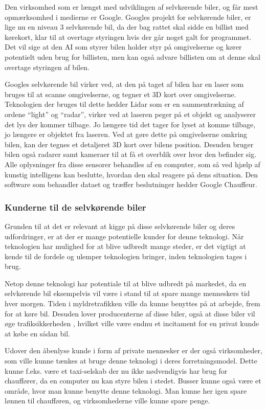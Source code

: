 Den virksomhed som er længst med udviklingen af selvkørende biler, og får mest opmærksomhed i medierne er Google. Googles projekt for selvkørende biler, er lige nu en niveau 3 selvkørende bil, da der bag rattet skal sidde en billist med kørekort, klar til at overtage styringen hvis der går noget galt for programmet. Det vil sige at den AI som styrer bilen holder styr på omgivelserne og kører potentielt uden brug for billisten, men kan også advare billisten om at denne skal overtage styringen af bilen.

Googles selvkørende bil virker ved, at den på taget af bilen har en laser som bruges til at scanne omgivelserne, og tegner et 3D kort over omgivelserne. Teknologien der bruges til dette hedder Lidar som er en sammentrækning af ordene ``light'' og ``radar'', virker ved at laseren peger på et objekt og analyserer det lys der kommer tilbage. Jo længere tid det tager for lyset at komme tilbage, jo længere er objektet fra laseren. Ved at gøre dette på omgivelserne omkring bilen, kan der tegnes et detaljeret 3D kort over bilens position. Desuden bruger bilen også radarer samt kameraer til at få et overblik over hvor den befinder sig. Alle oplysninger fra disse sensorer behandles af en computer, som så ved hjælp af kunstig intelligens kan beslutte, hvordan den skal reagere på dens situation. Den software som behandler dataet og træffer beslutninger hedder Google Chauffeur.

\subsubsection{Kunderne til de selvkørende biler}
Grunden til at det er relevant at kigge på disse selvkørende biler og deres udfordringer, er at der er mange potentielle kunder for denne teknologi. Når teknologien har mulighed for at blive udbredt mange steder, er det vigtigt at kende til de fordele og ulemper teknologien bringer, inden teknologien tages i brug.

Netop denne teknologi har potentiale til at blive udbredt på markedet, da en selvkørende bil eksempelvis vil være i stand til at spare mange menneskers tid hver morgen. Tiden i myldretrafikken ville da kunne benyttes på at arbejde, frem for at køre bil. Desuden lover producenterne af disse biler, også at disse biler vil øge trafiksikkerheden \cite{GOOG_SITE}, hvilket ville være endnu et incitament for en privat kunde at købe en sådan bil.

Udover den åbenlyse kunde i form af private mennesker er der også virksomheder, som ville kunne tænkes at bruge denne teknologi i deres forretningsmodel. Dette kunne f.eks. være et taxi-selskab der nu ikke nødvendigvis har brug for chauffører, da en computer nu kan styre bilen i stedet. Busser kunne også være et område, hvor man kunne benytte denne teknologi. Man kunne her igen spare lønnen til chaufføren, og virksomhederne ville kunne spare penge.

